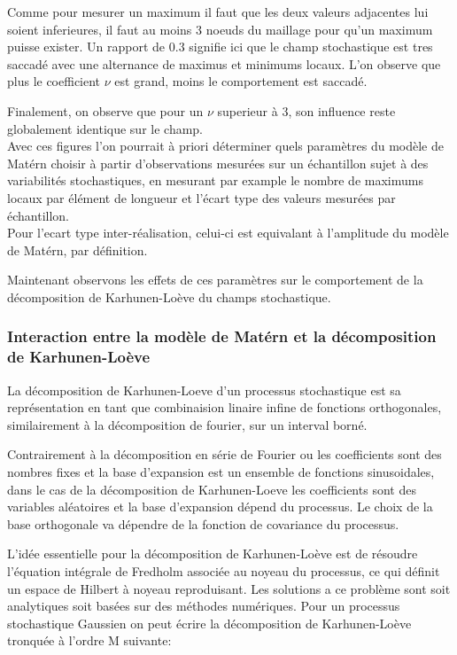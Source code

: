 \documentclass[a4paper,10pt]{article}
\begin{document}
Comme pour mesurer un maximum il faut que les deux valeurs adjacentes lui soient inferieures, il faut au moins 3 noeuds du maillage pour qu'un maximum puisse exister. Un rapport de 0.3 signifie ici que le champ stochastique est tres saccadé avec une alternance de maximus et minimums locaux. L'on observe que plus le coefficient $\nu$ est grand, moins le comportement est saccadé. \par

Finalement, on observe que pour un $\nu$ superieur à 3, son influence reste globalement identique sur le champ. \\

Avec ces figures l'on pourrait à priori déterminer quels paramètres du modèle de Matérn choisir à partir d'observations mesurées sur un échantillon sujet à des variabilités stochastiques, en mesurant par example le nombre de maximums locaux par élément de longueur et l'écart type des valeurs mesurées par échantillon. \\ 

Pour l'ecart type inter-réalisation, celui-ci est equivalant à l'amplitude du modèle de Matérn, par définition.  \par

Maintenant observons les effets de ces paramètres sur le comportement de la décomposition de Karhunen-Loève du champs stochastique. 

\subsubsection{Interaction entre la modèle de Matérn et la décomposition de Karhunen-Loève}

	 La décomposition de Karhunen-Loeve d'un processus stochastique est sa représentation en tant que combinaision linaire infine de fonctions orthogonales, similairement à la décomposition de fourier, sur un interval borné. \par
	 Contrairement à la décomposition en série de Fourier ou les coefficients sont des nombres fixes et la base d'expansion est un ensemble de fonctions sinusoidales, dans le cas de la décomposition de Karhunen-Loeve les coefficients sont des variables aléatoires et la base d'expansion dépend du processus. Le choix de la base orthogonale va dépendre de la fonction de covariance du processus. \par
	 L'idée essentielle pour la décomposition de Karhunen-Loève est de résoudre l'équation intégrale de Fredholm associée au noyeau du processus, ce qui définit un espace de Hilbert à noyeau reproduisant. Les solutions a ce problème sont soit analytiques soit basées sur des méthodes numériques. Pour un processus stochastique Gaussien on peut écrire la décomposition de Karhunen-Loève tronquée à l'ordre M suivante:
	 
\end{document}
